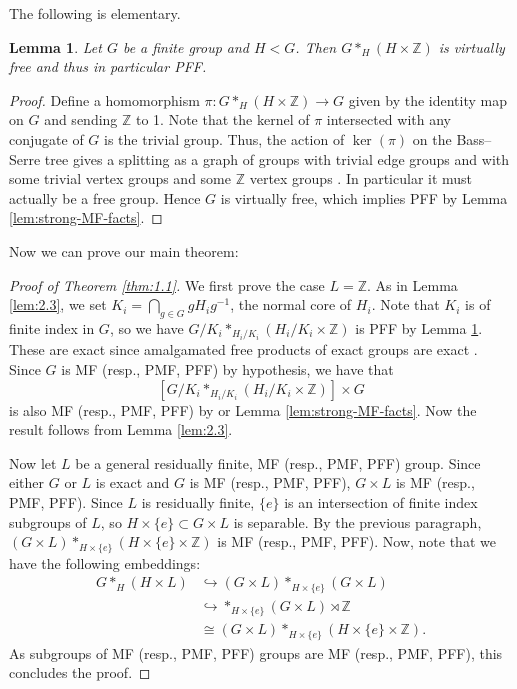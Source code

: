 \documentclass[10pt]{amsart}
\newtheorem{lem}[thm]{Lemma}
\theoremstyle{definition}
\newcommand{\Z}{\ensuremath{\mathbb{Z}}}
\begin{document}
The following is elementary.

\begin{lem}\label{lem:2.4}
    Let $G$ be a finite group and $H<G$. Then $G\ast_{H} (H\times \Z)$ is virtually free and thus in particular PFF.
\end{lem}
\begin{proof}
   Define a homomorphism $\pi: G*_H (H\times \Z)\to G$ given by the identity map on $G$ and sending $\Z$  to 1. Note that the kernel of $\pi$ intersected with any conjugate of $G$ is the trivial group. Thus, the action of $\ker(\pi)$ on the Bass--Serre tree gives a splitting as a graph of groups with trivial edge groups and with some trivial vertex groups and some $\Z$ vertex groups \cite{Ser80}. In particular it must actually be a free group. Hence $G$ is virtually free, which implies PFF by Lemma \ref{lem:strong-MF-facts}. 
\end{proof}

Now we can prove our main theorem:
\begin{proof}[Proof of Theorem \ref{thm:1.1}]
    We first prove the case $L = \mathbb Z$. As in Lemma \ref{lem:2.3}, we set $K_i = \bigcap_{g \in G} gH_ig^{-1}$, the normal core of $H_i$. Note that $K_i$ is of finite index in $G$, so we have $G/K_i\ast_{H_i/K_i} (H_i/K_i\times\mathbb{Z})$ is PFF by Lemma \ref{lem:2.4}. These are exact since amalgamated free products of exact groups are exact \cite[Theorem 3.2]{Dykema2004Exactness}. Since $G$ is MF (resp., PMF, PFF) by hypothesis, we have that \[[G/K_i\ast_{H_i/K_i} (H_i/K_i\times\mathbb{Z})]\times G\] is also MF (resp., PMF, PFF) by \cite[Prop 3.2]{HadwinShen2010} or Lemma \ref{lem:strong-MF-facts}. Now the result follows from Lemma \ref{lem:2.3}.

    Now let $L$ be a general residually finite, MF (resp., PMF, PFF) group. Since either $G$ or $L$ is exact and $G$ is MF (resp., PMF, PFF), $G\times L$ is MF (resp., PMF, PFF). Since $L$ is residually finite, $\{e\}$ is an intersection of finite index subgroups of $L$, so $H\times \{e\} \subset G\times L$ is separable. By the previous paragraph, $(G\times L) *_{H\times\{e\}}(H\times\{e\}\times \mathbb Z)$ is MF (resp., PMF, PFF). Now, note that we have the following embeddings:
    \begin{align*}
        G*_H(H\times L) &\hookrightarrow (G\times L) *_{H\times\{e\}} (G\times L) \\
        & \hookrightarrow \ast_{H\times\{e\}} (G\times L)\rtimes \mathbb{Z}\\
        &\cong (G\times L) *_{H\times\{e\}}(H\times\{e\}\times \mathbb Z).
    \end{align*}
    As subgroups of MF (resp., PMF, PFF) groups are MF (resp., PMF, PFF), this concludes the proof.
\end{proof}
\end{document}
